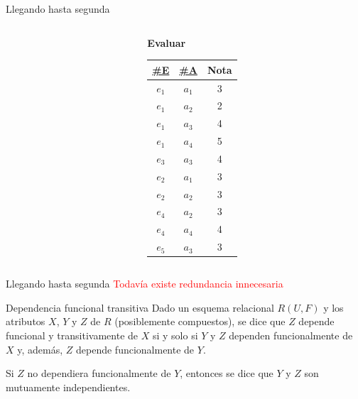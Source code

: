 \begin{frame}{Llegando hasta segunda}
\begin{columns}[T]
\begin{column}{0.68\linewidth}
\begin{center}
\begin{tabular}{cc}
                \end{tabular}
            \end{center}
            
        \end{column}

        \begin{column}{0.3\linewidth}
            \vspace{6mm}
            \begin{center}
                \textbf{Evaluar}\\[2mm]

                \begin{tabular}{ccc}
                    \underline{\#E} & \underline{\#A} & Nota\\[1mm]
                    \hline
                    $e_1$ & $a_1$ & 3\\
                    $e_1$ & $a_2$ & 2\\
                    $e_1$ & $a_3$ & 4\\
                    $e_1$ & $a_4$ & 5\\
                    $e_3$ & $a_3$ & 4\\
                    $e_2$ & $a_1$ & 3\\
                    $e_2$ & $a_2$ & 3\\
                    $e_4$ & $a_2$ & 3\\
                    $e_4$ & $a_4$ & 4\\
                    $e_5$ & $a_3$ & 3\\
                \end{tabular}
            \end{center}
        \end{column}
    \end{columns}
\end{frame}

\begin{frame}{Llegando hasta segunda}
    \centering
    \Large \textcolor{red}{Todav\'ia existe redundancia innecesaria}
\end{frame}

\begin{frame}{Dependencia funcional transitiva}
    Dado un esquema relacional $R(U,F)$ y los atributos $X$, $Y$ y $Z$ de
    $R$ (posiblemente compuestos), se dice que $Z$ depende funcional
    y transitivamente de $X$ si y solo si $Y$ y $Z$ dependen funcionalmente
    de $X$ y, adem\'as, $Z$ depende funcionalmente de $Y$.

    Si $Z$ no dependiera funcionalmente de $Y$, entonces se dice que $Y$ y $Z$
    son mutuamente independientes.

    
\end{frame}

